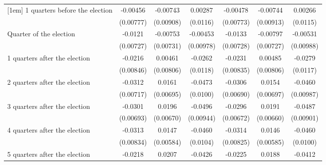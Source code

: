 \begin{table}[!ht]
\begin{tabular}{l*{6}{c}}
[1em]
 1 quarters before the election&    -0.00456         &    -0.00743         &     0.00287         &    -0.00478         &    -0.00744         &     0.00266         \\
                    &   (0.00777)         &   (0.00908)         &    (0.0116)         &   (0.00773)         &   (0.00913)         &    (0.0115)         \\
[1em]
Quarter of the election&     -0.0121         &    -0.00753         &    -0.00453         &     -0.0133         &    -0.00797         &    -0.00531         \\
                    &   (0.00727)         &   (0.00731)         &   (0.00978)         &   (0.00728)         &   (0.00727)         &   (0.00988)         \\
[1em]
 1 quarters after the election&     -0.0216\sym{*}  &     0.00461         &     -0.0262\sym{*}  &     -0.0231\sym{**} &     0.00485         &     -0.0279\sym{*}  \\
                    &   (0.00846)         &   (0.00806)         &    (0.0118)         &   (0.00835)         &   (0.00806)         &    (0.0117)         \\
[1em]
 2 quarters after the election&     -0.0312\sym{***}&      0.0161\sym{*}  &     -0.0473\sym{***}&     -0.0306\sym{***}&      0.0154\sym{*}  &     -0.0460\sym{***}\\
                    &   (0.00717)         &   (0.00695)         &    (0.0100)         &   (0.00690)         &   (0.00697)         &   (0.00987)         \\
[1em]
 3 quarters after the election&     -0.0301\sym{***}&      0.0196\sym{**} &     -0.0496\sym{***}&     -0.0296\sym{***}&      0.0191\sym{**} &     -0.0487\sym{***}\\
                    &   (0.00693)         &   (0.00670)         &   (0.00944)         &   (0.00672)         &   (0.00660)         &   (0.00901)         \\
[1em]
 4 quarters after the election&     -0.0313\sym{***}&      0.0147\sym{*}  &     -0.0460\sym{***}&     -0.0314\sym{***}&      0.0146\sym{*}  &     -0.0460\sym{***}\\
                    &   (0.00834)         &   (0.00584)         &    (0.0104)         &   (0.00825)         &   (0.00585)         &    (0.0100)         \\
[1em]
 5 quarters after the election&     -0.0218\sym{**} &      0.0207\sym{*}  &     -0.0426\sym{**} &     -0.0225\sym{**} &      0.0188\sym{*}  &     -0.0412\sym{**} \\

\end{tabular}
\end{table}
